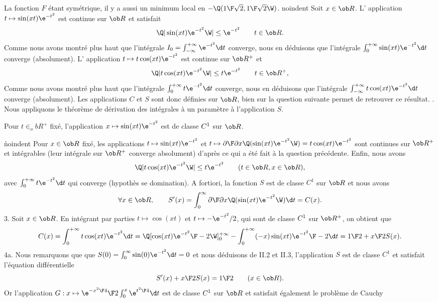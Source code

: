 La fonction $F$ \'etant sym\'etrique, il y a aussi un minimum local en $-\Q({1\F\sqrt2}, {1\F\sqrt2}\W)$.
\medskip
noindent
Soit $x\in\ob R$. L' application $t\mapsto\sin(xt)\e^{-t^2}$ est continue sur $\ob R$ et satisfait 
$$
\Q|\sin(xt)\e^{-t^2}\W| \le \e^{-t^2}\qquad t\in\ob R. 
$$
Comme nous avons montr\'e plus haut que l'int\'egrale $I_0=\int_{-\infty}^{+\infty}\e^{-t^2}\d t$ converge, nous en d\'eduisons que l'int\'egrale $\int_0^{+\infty}\sin(xt)\e^{-t^2}\d t$ converge (absolument).
\medskip\noindent
 L' application $t\mapsto t\cos(xt)\e^{-t^2}$ est continue sur $\ob R^+$ et  
$$
\Q|t \cos(xt)\e^{-t^2}\W| \le t\e^{-t^2}\qquad t\in\ob R^+, 
$$
Comme nous avons montr\'e plus haut que l'int\'egrale $\int_0^{+\infty}t\e^{-t^2}\d t$ converge, nous en d\'eduisons que 
l'int\'egrale $\int_{-\infty}^{+\infty}t\cos(xt)\e^{-t^2}\d t$ converge (absolument).
\medskip\noindent
Les applications $C$ et $S$ sont donc d\'efinies sur $\ob R$, bien sur la question suivante permet de retrouver ce r\'esultat. 
\medskip{}. Nous appliquons le th\'eor\`eme de d\'erivation des int\'egrales \`a un param\`etre \`a l'application $S$. \par\noindent
Pour $t\in_ob R^+$ fix\'e, l'application $x\mapsto \sin(xt)\e^{-t^2}$ est de classe $\sc C^1$ sur $\ob R$. \par \`noindent
Pour $x\in\ob R$ fix\'e, les applications $t\mapsto \sin(xt)\e^{-t^2}$ et $t\mapsto {\partial\F\partial x}\Q(\sin(xt)\e^{-t^2}\W)=t\cos(xt)\e^{-t^2}$ sont continues sur $\ob R^+$ et int\'egrables (leur int\'egrale sur $\ob R^+$ converge absolument) d'apr\`es ce qui a \'et\'e fait \`a la question pr\'ec\'edente. Enfin, nous avons 
$$
\Q|t \cos(xt)\e^{-t^2}\W| \le t\e^{-t^2}\qquad (t\in\ob R,x\in \ob R), 
$$
avec $\int_0^{+\infty}t\e^{-t^2}\d t$ qui converge (hypoth\`es se domination). A fortiori, la fonction $S$ est de classe $C^1$ sur $\ob R$ et nous avons 
$$
\forall x\in\ob R, \qquad S'(x)=\int_0^{\infty}{\partial\F\partial x}\Q(\sin(xt)\e^{-t^2}\W)\d t=C(x).
$$
3. Soit $x\in\ob R$. En int\'egrant par parties $t\mapsto \cos(xt)$ et $t\mapsto -\e^{-t^2}/2$, qui sont de classe $\sc C^1$ sur $\ob R^+$, on obtient que 
$$
C(x)=\int_0^{+\infty}t\cos(xt)\e^{-t^2}\d t=\Q[\cos(xt){\e^{-t^2}\F -2}\W]_0^{+\infty}-\int_0^{+\infty}(-x)\sin(xt){\e^{-t^2}\F -2}\d t= {1\F 2}+{x\F 2}S(x).
$$
4a. Nous remarquons que que $S(0)=\int_0^\infty\sin(0)\e^{-t^2}\d t=0$ et nous d\'eduisons de II.2 et II.3, l'application $S$ est de classe $C^1$ et satisfait l'\'equation diff\'erentielle 
$$
S'(x)+{x\F 2}S(x)={1\F 2}\qquad (x\in\ob R). 
$$
Or l'application $G:x\mapsto {\e^{-x^2\F 4}\F 2}\int_0^x\e^{t^2\F 4}\d t$ est de classe $\sc C^1$ sur $\ob R$ et satisfait \'egalement le probl\`eme de Cauchy 
